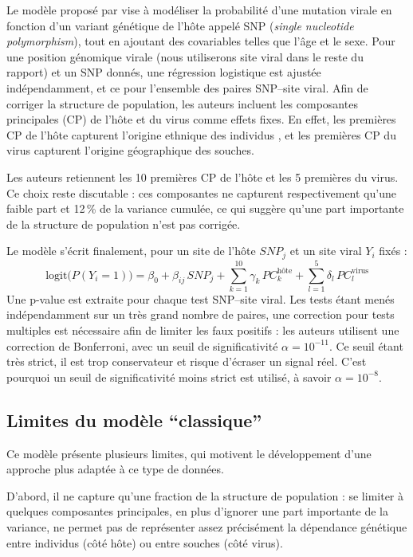 \documentclass[11pt,a4paper]{article}
\begin{document}
Le modèle proposé par \cite{Ansari2017} vise à modéliser la probabilité d'une mutation
virale en fonction d'un variant génétique de l'hôte appelé SNP (\textit{single nucleotide polymorphism}), tout en ajoutant des covariables telles que l'âge et le
sexe. Pour une position génomique virale (nous utiliserons site viral dans le reste du rapport) et un SNP donnés, une régression logistique est ajustée
indépendamment, et ce pour l'ensemble des paires SNP--site viral.
\noindent
Afin de corriger la structure de population, les auteurs incluent les composantes
principales (CP) de l'hôte et du virus comme effets fixes. En effet, les
premières CP de l'hôte capturent l'origine ethnique des individus \cite{PCAstratification},
et les premières CP du virus capturent l'origine géographique des souches.

\vspace{1cm}
\noindent
Les auteurs retiennent les 10 premières CP de l'hôte et les 5 premières du
virus. Ce choix reste discutable : ces composantes ne capturent respectivement
qu'une faible part et 12\,\% de la variance cumulée, ce qui suggère qu'une part
importante de la structure de population n'est pas corrigée.

Le modèle s'écrit finalement, pour un site de l'hôte $SNP_j$ et un site viral $Y_i$ fixés :
\[
\text{logit}\big(P(Y_i = 1)\big) = \beta_0 + \beta_{ij}\, SNP_j
+ \sum_{k=1}^{10} \gamma_k\, PC^{\text{hôte}}_k + \sum_{l=1}^{5} \delta_l\, PC^{\text{virus}}_l
\]
\noindent
Une p-value est extraite pour chaque test SNP--site viral. Les tests étant
menés indépendamment sur un très grand nombre de paires, une correction pour
tests multiples est nécessaire afin de limiter les faux positifs : les
auteurs utilisent une correction de Bonferroni, avec un seuil de
significativité $\alpha = 10^{-11}$. Ce seuil étant très strict, il est trop conservateur et risque d'écraser un signal réel.
C'est pourquoi un seuil de significativité moins strict est utilisé, à savoir $\alpha = 10^{-8}$.


\subsection{Limites du modèle ``classique''}

Ce modèle présente plusieurs limites, qui motivent le développement d'une
approche plus adaptée à ce type de données.

D'abord, il ne capture qu'une fraction de la structure de population : se
limiter à quelques composantes principales, en plus d'ignorer une part
importante de la variance, ne permet pas de représenter assez précisément la
dépendance génétique entre individus (côté hôte) ou entre souches (côté
virus).
\end{document}
